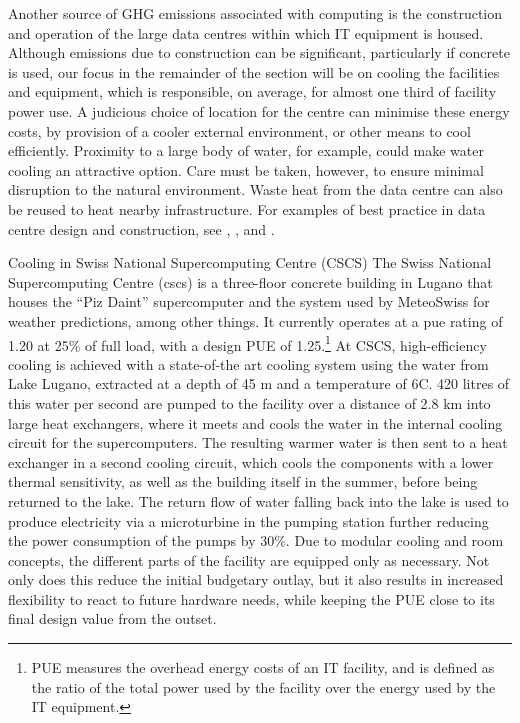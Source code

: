 \documentclass[../SustainableHEP.tex]{subfiles}
\begin{document}
Another source of GHG emissions associated with computing is the construction and operation of the large data centres within which IT equipment is housed.  Although emissions due to construction can be significant, particularly if concrete is used, our focus in the remainder of the section will be on cooling the facilities and equipment, which is responsible, on average, for almost one third of facility power use. A judicious choice of location for the centre can minimise these energy costs, by provision of a cooler external environment, or other means to cool efficiently.  Proximity to a large body of water, for example, could make water cooling an attractive option.  Care must be taken, however, to ensure minimal disruption to the natural environment.  Waste heat from the data centre can also be reused to heat nearby infrastructure. For examples of best practice in data centre design and construction, see , , and .


\begin{bestpractice}{Cooling in Swiss National Supercomputing Centre (CSCS)}%
    The Swiss National Supercomputing Centre (\acrshort{cscs}) is a three-floor concrete building in Lugano that houses the “Piz Daint” supercomputer and the system used by MeteoSwiss for weather predictions, among other things.  It currently operates at a \acrshort{pue} rating of 1.20 at 25\% of full load, with a design PUE of 1.25.\footnote{PUE measures the overhead energy costs of an IT facility, and is defined as the ratio of the total power used by the facility over the energy used by the IT equipment.}
    At CSCS, high-efficiency cooling is achieved with a state-of-the art cooling system using the water from Lake Lugano, extracted at a depth of 45 m 
    and a temperature of 6\degree C. 420 litres of this water per second are pumped to the facility over a distance of 2.8 km into large heat exchangers, where it meets and cools the water in the internal cooling circuit for the supercomputers. The resulting warmer water is then sent to a heat exchanger in a second cooling circuit, which cools the components with a lower thermal sensitivity, as well as the building itself in the summer, before being returned to the lake. The return flow of water falling back into the lake is used to produce electricity via a microturbine in the pumping station further reducing the power consumption of the pumps by 30\%.  Due to modular cooling and room concepts, the different parts of the facility are equipped only as necessary.  Not only does this reduce the initial budgetary outlay, but it also results in increased flexibility to react to future hardware needs, while keeping the PUE close to its final design value from the outset.
\end{bestpractice}
\end{document}
